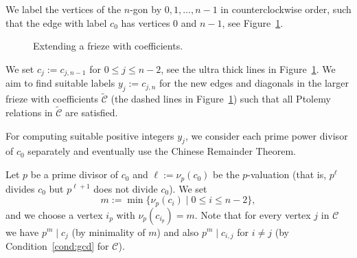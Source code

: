 \documentclass[ALCO,ThmDefs,Unicode,epreuves,published]{cedram}
\numberwithin{equation}{section}
\begin{document}

We label the vertices of the $n$-gon by $0,1,\ldots,n-1$ in counterclockwise order,
such that the edge with label $c_0$ has vertices $0$ and $n-1$, see Figure~\ref{fig:ext}. 

\begin{figure}[htb]\centering
{}
 \caption{Extending a frieze with coefficients. 
 \label{fig:ext}}
\end{figure}

We set $c_j:= c_{j,n-1}$ for $0\le j\le n-2$, see the ultra thick lines in
Figure~\ref{fig:ext}. We aim to find suitable labels $y_j:=c_{j,n}$ for the 
new edges and diagonals in the larger frieze with coefficients $\widetilde{\mathcal{C}}$
(the dashed lines in Figure~\ref{fig:ext})
such that all Ptolemy relations in $\widetilde{\mathcal{C}}$ are satisfied. 

For computing suitable positive integers $y_j$, 
we consider each prime power divisor of $c_0$ separately and eventually use the 
Chinese Remainder Theorem.

Let $p$ be a prime divisor of $c_0$ and $\ell:=\nu_p(c_0)$ be the $p$-valuation
(that is, $p^{\ell}$ divides $c_0$ but $p^{\ell+1}$ does not divide $c_0$). 
We set
\[
m:= \min \{\nu_p(c_i)\mid 0\le i\le n-2\},
\]
and we choose a vertex $i_p$ with $\nu_p(c_{i_p})=m$. Note that for every vertex $j$
in $\mathcal{C}$ we have $p^m\mid c_j$ (by minimality of $m$) and 
also $p^m\mid c_{i,j}$ for $i\ne j$ (by Condition~\eqref{cond:gcd} for $\mathcal{C}$). 
\end{document}
